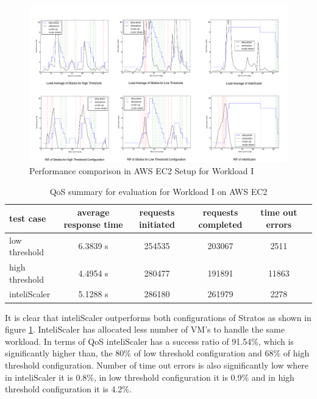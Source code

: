 \begin{figure}[h!]
\centering
\includegraphics[width=500px]{figures/results_workload_3_4}
\caption{Performance comparison in AWS EC2 Setup for Workload I}
\label{graph:workload_3}
\end{figure}

\begin{table}[h!]
\centering
\caption{QoS summary for evaluation for Workload I on AWS EC2}
\label{table:analysis_qos_workload_3}
\begin{tabular}{|l|c|c|c|c|c|}
\hline

test case & average  response time & requests initiated & requests completed  & time out errors \\ \hline

low threshold & 6.3839 s & 254535 & 203067 & 2511\\ \hline

high threshold & 4.4954 s & 280477 & 191891  & 11863\\ \hline

inteliScaler & 5.1288 s & 286180 & 261979  & 2278\\ \hline

\end{tabular}
\end{table}

It is clear that inteliScaler outperforms both configurations of Stratos as shown in figure \ref{graph:workload_3}. InteliScaler has allocated less number of VM's to handle the same workload. In terms of QoS inteliScaler has a success ratio of 91.54\%, which is significantly higher than, the 80\% of low threshold configuration and 68\% of high threshold configuration. Number of time out errors is also significantly low where in inteliScaler it is  0.8\%, in low threshold configuration it is 0.9\%  and in high threshold configuration it is  4.2\%. 

